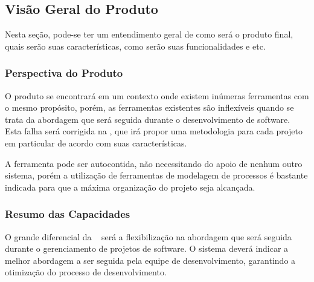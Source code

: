 \subsection{Visão Geral do Produto}
	
Nesta seção, pode-se ter um entendimento geral de como será o produto final, quais serão suas características, como serão suas funcionalidades e etc.

\subsubsection{Perspectiva do Produto}
	
O produto se encontrará em um contexto onde existem inúmeras ferramentas com o mesmo propósito, porém, as ferramentas existentes são inflexíveis quando se trata da abordagem que será seguida durante o desenvolvimento de software. Esta falha será corrigida na \nomeferramenta, que irá propor uma metodologia para cada projeto em particular de acordo com suas características.

A ferramenta pode ser autocontida, não necessitando do apoio de nenhum outro sistema, porém a utilização de ferramentas de modelagem de processos é bastante indicada para que a máxima organização do projeto seja alcançada.

\subsubsection{Resumo das Capacidades}
	
O grande diferencial da \nomeferramenta~ será a flexibilização na abordagem que será seguida durante o gerenciamento de projetos de software. O sistema deverá indicar a melhor abordagem a ser seguida pela equipe de desenvolvimento, garantindo a otimização do processo de desenvolvimento.

